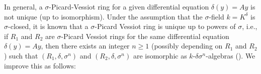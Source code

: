 \documentclass[oneside,reqno]{amsart}
\theoremstyle{definition}
\newcommand{\s}{\sigma}
\newcommand{\de}{\delta}
\newcommand{\mw}[1]{\todo[inline,color=green!20!white]{\textbf{Michael:} #1}}
\begin{document}
In general, a $\s$-Picard-Vessiot ring for a given differential equation $\de(y)=Ay$ is not unique (up to isomorphism). Under the assumption that the $\s$-field $k=K^\de$ is $\s$-closed, it is known that a $\s$-Picard Vessiot ring is unique up to powers of $\s$, i.e., if $R_1$ and $R_2$ are $\s$-Picard Vessiot rings for the same differential equation $\de(y)=Ay$, then there exists an integer $n\geq 1$ (possibly depending on $R_1$ and $R_2$) such that $(R_1,\de,\s^n)$ and $(R_2,\de,\s^n)$ are isomorphic as $k$-$\de\s^n$-algebras (\cite[Cor. 1.17]{DiVizioHardouinWibmer:DifferenceGaloisTheoryOfLinearDifferentialEquations}). We improve this as follows:
%
\end{document}
